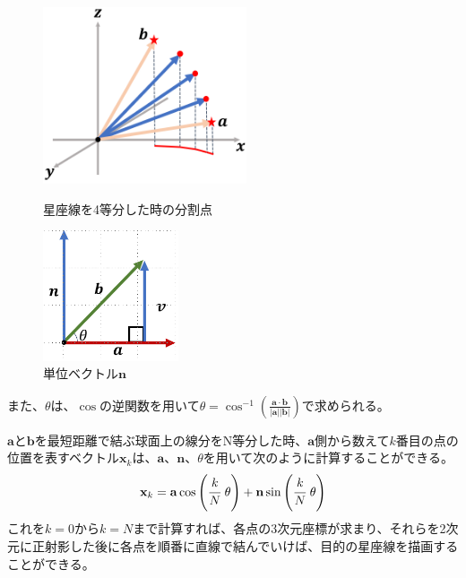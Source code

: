 \documentclass[../main]{subfiles}
\begin{document}
\begin{figure}[H]
  \centering
  \begin{minipage}[b]{0.45\linewidth}
    \centering
    \label{fig:split}
    \includegraphics[width=6cm]{sections/Fujisawa/image/starline_split.PNG}
    \caption{星座線を4等分した時の分割点}
  \end{minipage}
  \begin{minipage}[b]{0.45\linewidth}
    \centering
    \includegraphics[width=4cm]{sections/Fujisawa/image/n_angle.PNG}
    \caption{単位ベクトル$\mathbf{n}$}
    \label{fig02}
  \end{minipage}
\end{figure}

また、$\theta$は、$\cos$の逆関数を用いて$\theta = \cos^{-1}{\left( \frac{ \mathbf{a} \cdot \mathbf{b} }{ |\mathbf{a}| |\mathbf{b} |} \right)}$で求められる。

$\mathbf{a}$と$\mathbf{b}$を最短距離で結ぶ球面上の線分をN等分した時、$\mathbf{a}$側から数えて$k$番目の点の位置を表すベクトル$\mathbf{x}_k$は、$\mathbf{a}$、$\mathbf{n}$、$\theta$を用いて次のように計算することができる。
\[
  \mathbf{x}_k = \mathbf{a}\cos{\left( \cfrac{k}{N}\ \theta \right)} + \mathbf{n}\sin{\left( \cfrac{k}{N}\ \theta \right)}
\]
これを$k=0$から$k=N$まで計算すれば、各点の3次元座標が求まり、それらを2次元に正射影した後に各点を順番に直線で結んでいけば、目的の星座線を描画することができる。
\end{document}
